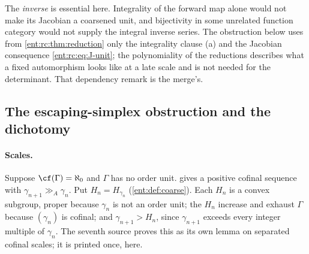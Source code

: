 \documentclass[11pt]{article}
\theoremstyle{plain}
\theoremstyle{plain}
\theoremstyle{plain}
\theoremstyle{definition}
\theoremstyle{definition}
\theoremstyle{definition}
\theoremstyle{definition}
\theoremstyle{remark}
\newcommand{\ggA}{\mathrel{\gg_{\!A}}}
\begin{document}
The \emph{inverse} is essential here. Integrality of the forward map alone
would not make its Jacobian a coarsened unit, and bijectivity in some
unrelated function category would not supply the integral inverse series.
The obstruction below uses from \cref{ent:rc:thm:reduction} only the
integrality clause (a) and the Jacobian consequence
\eqref{ent:rc:eq:J-unit}; the polynomiality of the reductions describes what a
fixed automorphism looks like at a late scale and is not needed for the
determinant. That dependency remark is the merge's.

\subsection{The escaping-simplex obstruction and the dichotomy}
\label{ent:rc:subsec:obstruction}

\paragraph{Scales.} Suppose $\cf(\Gamma)=\aleph_0$ and $\Gamma$ has no order
unit.  gives a positive cofinal sequence with
$\gamma_{n+1}\ggA\gamma_n$. Put $H_n=H_{\gamma_n}$ (\cref{ent:def:coarse}).
Each $H_n$ is a convex subgroup, proper because $\gamma_n$ is not an order
unit; the $H_n$ increase and exhaust $\Gamma$ because $(\gamma_n)$ is
cofinal; and $\gamma_{n+1}>H_n$, since $\gamma_{n+1}$ exceeds every integer
multiple of $\gamma_n$. The seventh source proves this as its own lemma on
separated cofinal scales; it is printed once, here.
\end{document}
